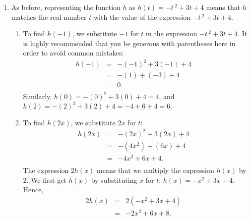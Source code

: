 \documentclass{ximera}
\begin{document}
\begin{example}
\begin{explanation}
\begin{enumerate}
\begin{enumerate}
\begin{itemize}
\end{itemize}

Hence, we have codified $f$ using the formula $f(x) = 3x + 5$.   In other words, the function $f$ matches each real number `$x$' with the value of the expression `$3x + 5$'.  As a partial check of our answer, we use this formula to find $f(-5)$.  We compute $f(-5)$ by substituting $x = -5$ into the formula $f(x)$ and find  $f(-5) = 3(-5) + 5 = -10$ as before.

\end{enumerate}


\item As before, representing the function $h$ as  $h(t) = -t\,^{2} + 3t + 4$ means that $h$ matches the real number $t$ with the value of the expression  $-t\,^{2} + 3t + 4$.

\begin{enumerate} 

\item  To find $h(-1)$, we substitute $-1$ for $t$  in the expression $-t\,^{2} + 3t + 4$. It is highly recommended that you be generous with parentheses here in order to avoid common mistakes: \[ \begin{array}{rclr}  
h(-1) & = & -(-1)^2 + 3(-1) + 4 & \\  
      & = & -(1) + (-3) + 4 & \\  
      & = & 0 .& \\ 
      \end{array} \] Similarly, $h(0) = -(0)^2 + 3(0) + 4 = 4$, and $h(2) = -(2)^2 + 3(2) + 4 = -4 + 6 + 4 = 6$.

\item To find $h(2x)$, we substitute $2x$ for $t$: \[ \begin{array}{rclr}  
h(2x) & = & -(2x)^2 + 3(2x) + 4 & \\  
      & = & -(4x^2) + (6x) + 4 & \\  
      & = & -4x^2+6x+4. & \\ 
      \end{array} \] The expression $2h(x)$ means that we multiply the expression $h(x)$ by $2$.  We first get $h(x)$ by substituting $x$ for $t$:  $h(x) = -x^2 + 3x + 4$.  Hence, \[ \begin{array}{rclr}  
2h(x) & = & 2\left(-x^2 + 3x + 4\right) & \\  
      & = & -2x^2 + 6x + 8. \\ 
      \end{array} \]


\end{enumerate}
\end{enumerate}
\end{explanation}
\end{example}
\end{document}
